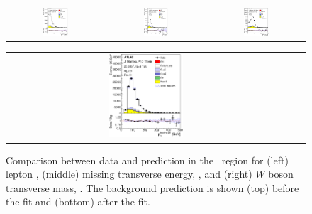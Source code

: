 \begin{figure}[tp]
\begin{tabular}{ccc}
  \includegraphics[width=0.27\textwidth]{Analysis/Figures_ttH/tesis_vars/postfit/lep_pt_4jetex2btagex.eps} &
  \includegraphics[width=0.27\textwidth]{Analysis/Figures_ttH/tesis_vars/postfit/met_4jetex2btagex.eps} &
  \includegraphics[width=0.27\textwidth]{Analysis/Figures_ttH/tesis_vars/postfit/WlepMT_4jetex2btagex.eps} \\
\end{tabular}
\caption{Comparison between data and prediction in the \fourtwo\ region for (left) lepton \pt,  (middle) missing transverse energy, \met, and (right)  $W$ boson transverse mass, \mtw. The background prediction is shown (top) before the fit and (bottom) after the fit.}
  \label{fig:vars1_fourtwo}
\vspace{0.5cm}
  \centering
  \begin{tabular}{ccc}
  \includegraphics[width=0.27\textwidth]{Analysis/Figures_ttH/tesis_vars/prefit/jet1_pt_4jetex2btagex.eps} &

\end{tabular}
\end{figure}
